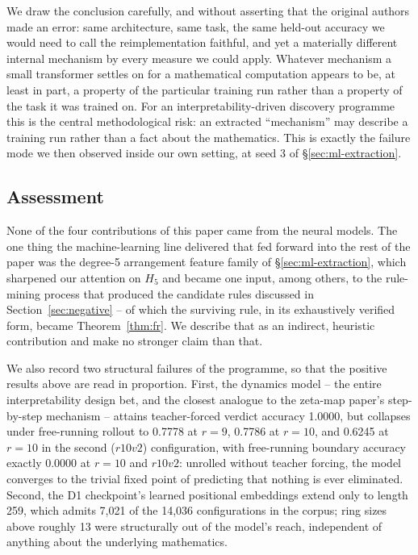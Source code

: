 We draw the conclusion carefully, and without asserting that the original
authors made an error: same architecture, same task, the same held-out
accuracy we would need to call the reimplementation faithful, and yet a
materially different internal mechanism by every measure we could apply.
Whatever mechanism a small transformer settles on for a mathematical
computation appears to be, at least in part, a property of the particular
training run rather than a property of the task it was trained on. For an
interpretability-driven discovery programme this is the central
methodological risk: an extracted ``mechanism'' may describe a training
run rather than a fact about the mathematics. This is exactly the failure
mode we then observed inside our own setting, at seed 3 of
\S\ref{sec:ml-extraction}.

\subsection{Assessment}

None of the four contributions of this paper came from the neural models.
The one thing the machine-learning line delivered that fed forward into
the rest of the paper was the degree-5 arrangement feature family of
\S\ref{sec:ml-extraction}, which sharpened our attention on $H_5$ and became
one input, among others, to the rule-mining process that produced the
candidate rules discussed in Section~\ref{sec:negative} -- of which the
surviving rule, in its exhaustively verified form, became
Theorem~\ref{thm:fr}. We describe that as an indirect, heuristic
contribution and make no stronger claim than that.

We also record two structural failures of the programme, so that the
positive results above are read in proportion. First, the dynamics
model -- the entire interpretability design bet, and the closest analogue
to the zeta-map paper's step-by-step mechanism -- attains teacher-forced
verdict accuracy 1.0000, but collapses under free-running rollout to
0.7778 at $r=9$, 0.7786 at $r=10$, and 0.6245 at $r=10$ in the second
($r10v2$) configuration, with free-running boundary accuracy exactly
0.0000 at $r=10$ and $r10v2$: unrolled without teacher forcing, the model
converges to the trivial fixed point of predicting that nothing is ever
eliminated. Second, the D1 checkpoint's learned positional embeddings
extend only to length 259, which admits 7{,}021 of the 14{,}036
configurations in the corpus; ring sizes above roughly 13 were structurally
out of the model's reach, independent of anything about the underlying
mathematics.

